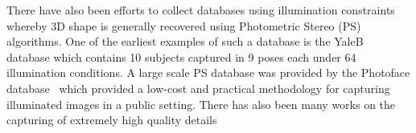 There have also been efforts to collect databases using illumination constraints
whereby 3D shape is generally recovered using Photometric Stereo (PS) 
algorithms. One of the earliest examples of such a database is the 
YaleB~\cite{RefWorks:314} database which contains 10 subjects captured in 
9 poses each under 64 illumination conditions. A large scale PS database was
provided by the Photoface database~\cite{RefWorks:293} which provided a low-cost
and practical methodology for capturing illuminated images in a public setting.
There has also been many works on the capturing of extremely high quality
details 
